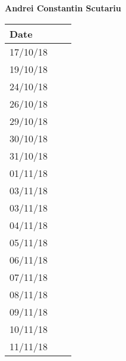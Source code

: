 \documentclass[../main.tex]{subfiles}
\begin{document}
\begin{center}
	{\bf Andrei Constantin Scutariu}
	\vspace{2mm}

		\begin{tabular}{p{1.3cm}|p{1.8cm}|p{6.7cm}}
			\hline
			\bf Date & \bf \makebox[1.8cm][c]{Hours} & \bf \makebox[6.7cm][c]{Description} \\
			\hline
			17/10/18 & \makebox[1.8cm][c]{2h} & \makebox[6.7cm][c]{Introduction}\\
			19/10/18 & \makebox[1.8cm][c]{3h} & \makebox[6.7cm][c]{Goals, Requirements, Domain assumptions}\\
			24/10/18 & \makebox[1.8cm][c]{4h} & \makebox[6.7cm][c]{Goals, Requirements, Domain assumptions}\\
			26/10/18 & \makebox[1.8cm][c]{1h} & \makebox[6.7cm][c]{Purpose, Scope}\\
			29/10/18 & \makebox[1.8cm][c]{2h} & \makebox[6.7cm][c]{UML Class Diagrams}\\
			30/10/18 & \makebox[1.8cm][c]{1h} & \makebox[6.7cm][c]{Purpose, Scope}\\
			31/10/18 & \makebox[1.8cm][c]{3h} & \makebox[6.7cm][c]{UML Class Diagrams}\\
			01/11/18 & \makebox[1.8cm][c]{1h} & \makebox[6.7cm][c]{Use Cases \& Scenarios}\\
			03/11/18 & \makebox[1.8cm][c]{1h} & \makebox[6.7cm][c]{Mockups, Scenarios}\\
			03/11/18 & \makebox[1.8cm][c]{2h} & \makebox[6.7cm][c]{UML Class \& State Machine Diagrams}\\
			04/11/18 & \makebox[1.8cm][c]{3h} & \makebox[6.7cm][c]{Specific Requirements}\\
			05/11/18 & \makebox[1.8cm][c]{1h} & \makebox[6.7cm][c]{Goals, Requirements, Domain assumptions}\\
			06/11/18 & \makebox[1.8cm][c]{1h} & \makebox[6.7cm][c]{Mockups}\\
			07/11/18 & \makebox[1.8cm][c]{4h} & \makebox[6.7cm][c]{Alloy}\\
			08/11/18 & \makebox[1.8cm][c]{5h} & \makebox[6.7cm][c]{Alloy, Revisioning}\\
			09/11/18 & \makebox[1.8cm][c]{4h} & \makebox[6.7cm][c]{Alloy}\\
			10/11/18 & \makebox[1.8cm][c]{5h} & \makebox[6.7cm][c]{Alloy, Revisioning}\\
			11/11/18 & \makebox[1.8cm][c]{4h} & \makebox[6.7cm][c]{Revisioning}\\
		\end{tabular}
\end{center}
\vspace{1cm}
\end{document}
